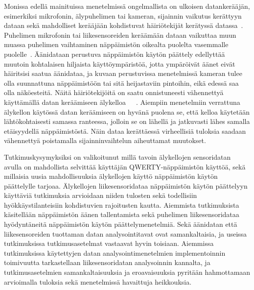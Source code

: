 \documentclass[finnish]{tktltiki2}
\theoremstyle{definition}
\theoremstyle{remark}
\begin{document}
Monissa edellä mainituissa menetelmissä ongelmallista on ulkoisen datankerääjän, esimerkiksi mikrofonin, älypuhelimen tai kameran, sijainnin vaikutus kerättyyn dataan sekä mahdolliset kerääjään kohdistuvat häiriötekijät kerätyssä datassa~\cite{berger}. Puhelimen mikrofonin tai liikesensoreiden keräämään dataan vaikuttaa muun muassa puhelimen vaihtaminen näppäimistön oikealta puolelta vasemmalle puolelle~\cite{mar}. Äänidataan perustuva näppäimistön käytön päättely edellyttää muutoin kohtalaisen hiljaista käyttöympäristöä, jotta ympäröivät äänet eivät häiritsisi saatua äänidataa, ja kuvaan perustuvissa menetelmissä kameran tulee olla suunnattuna näppäimistöön tai sitä heijastaviin pintoihin, eikä edessä saa olla näköesteitä. Näitä häiriötekijöitä on saatu onnistuneesti vähennettyä käyttämällä datan keräämiseen älykelloa~\cite{liu}~\cite{maiti}~\cite{mole}. Aiempiin menetelmiin verrattuna älykellon käytössä datan keräämiseen on hyvänä puolena se, että kelloa käytetään lähtökohtaisesti samassa ranteessa, jolloin se on lähellä ja jatkuvasti lähes samalla etäisyydellä näppäimistöstä. Näin dataa kerättäessä virheellisiä tuloksia saadaan vähennettyä poistamalla sijainninvaihtelun aiheuttamat muutokset. 

Tutkimuskysymyksiksi on valikoitunut millä tavoin älykellojen sensoridatan avulla on mahdollista selvittää käyttäjän QWERTY-näppäimistön käyttöä, sekä millaisia uusia mahdollisuuksia älykellojen käyttö näppäimistön käytön päättelylle tarjoaa. Älykellojen liikesensoridataa näppäimistön käytön päättelyyn käyttäviä tutkimuksia arvioidaan niiden tulosten sekä todellisiin hyökkäystilanteisiin kohdistuvien rajoitusten kautta. Aiemmista tutkimuksista käsitellään näppäimistön äänen tallentamista sekä puhelimen liikesensoridataa hyödyntäneitä näppäimistön käytön päättelymenetelmiä. Sekä äänidatan että liikesensoreiden tuottaman datan analysointitavat ovat samankaltaisia, ja useissa tutkimuksissa tutkimusasetelmat vastaavat hyvin toisiaan. Aiemmissa tutkimuksissa käytettyjen datan analysointimenetelmien implementoinnin toimivuutta tarkastellaan liikesensoridatan analysoinnin kannalta, ja tutkimusasetelmien samankaltaisuuksia ja eroavaisuuksia pyritään hahmottamaan arvioimalla tuloksia sekä menetelmissä havaittuja heikkouksia.
\end{document}
